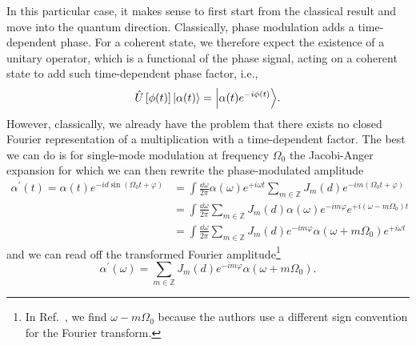 
In this particular case, it makes sense to first start from the classical result and move into the quantum direction.
Classically, phase modulation adds a time-dependent phase.
For a coherent state, we therefore expect the existence of a unitary operator, which is a functional of the phase signal, acting on a coherent state to add such time-dependent phase factor, i.e.,
\begin{equation}
	\hat{U}\left[\phi(t)\right]
	\ket*{\alpha(t)}
	=
	\ket*{\alpha(t)e^{-i\phi(t)}}
	.
\end{equation}
However, classically, we already have the problem that there exists no closed Fourier representation of a multiplication with a time-dependent factor.
The best we can do is for single-mode modulation at frequency $\Omega_0$ the Jacobi-Anger expansion for which we can then rewrite the phase-modulated amplitude
\begin{equation}
	\begin{split}
		\alpha^\prime(t)
		=
		\alpha(t)
		e^{-id\sin(\Omega_0t+\varphi)}
		&=
		\int\frac{\dd{\omega}}{2\pi}
		\alpha(\omega)
		e^{+i\omega t}
		\sum_{m\in\mathbb{Z}}
		J_m(d)
		e^{-im(\Omega_0t+\varphi)}
		\\
		&=
		\int\frac{\dd{\omega}}{2\pi}
		\sum_{m\in\mathbb{Z}}
		J_m(d)
		\alpha(\omega)
		e^{-im\varphi}
		e^{+i(\omega-m\Omega_0)t}
		\\
		&=
		\int\frac{\dd{\omega}}{2\pi}
		\sum_{m\in\mathbb{Z}}
		J_m(d)
		e^{-im\varphi}
		\alpha(\omega+m\Omega_0)
		e^{+i\omega t}
	\end{split}
\end{equation}
and we can read off the transformed Fourier amplitude\footnote{In Ref.~\cite{Horoshko2018}, we find $\omega-m\Omega_0$ because the authors use a different sign convention for the Fourier transform.}
\begin{equation}
	\alpha^\prime(\omega)
	=
	\sum_{m\in\mathbb{Z}}
	J_m(d)
	e^{-im\varphi}
	\alpha(\omega+m\Omega_0)
	.
\end{equation}
